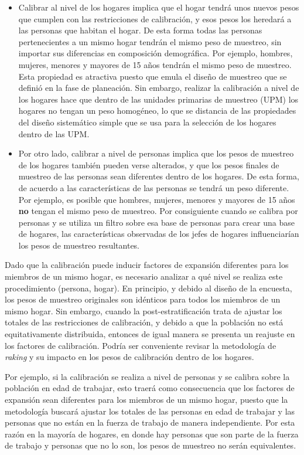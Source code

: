 \documentclass[
  12pt,
  spanish,
]{book}
\begin{document}
\begin{itemize}
\item
  Calibrar al nivel de los hogares implica que el hogar tendrá unos nuevos pesos que cumplen con las restricciones de calibración, y esos pesos los heredará a las personas que habitan el hogar. De esta forma todas las personas pertenecientes a un mismo hogar tendrán el mismo peso de muestreo, sin importar sus diferencias en composición demográfica. Por ejemplo, hombres, mujeres, menores y mayores de 15 años tendrán el mismo peso de muestreo. Esta propiedad es atractiva puesto que emula el diseño de muestreo que se definió en la fase de planeación. Sin embargo, realizar la calibración a nivel de los hogares hace que dentro de las unidades primarias de muestreo (UPM) los hogares no tengan un peso homogéneo, lo que se distancia de las propiedades del diseño sistemático simple que se usa para la selección de los hogares dentro de las UPM.
\item
  Por otro lado, calibrar a nivel de personas implica que los pesos de muestreo de los hogares también pueden verse alterados, y que los pesos finales de muestreo de las personas sean diferentes dentro de los hogares. De esta forma, de acuerdo a las características de las personas se tendrá un peso diferente. Por ejemplo, es posible que hombres, mujeres, menores y mayores de 15 años \textbf{no} tengan el mismo peso de muestreo. Por consiguiente cuando se calibra por personas y se utiliza un filtro sobre esa base de personas para crear una base de hogares, las características observadas de los jefes de hogares influenciarían los pesos de muestreo resultantes.
\end{itemize}

Dado que la calibración puede inducir factores de expansión diferentes para los miembros de un mismo hogar, es necesario analizar a qué nivel se realiza este procedimiento (persona, hogar). En principio, y debido al diseño de la encuesta, los pesos de muestreo originales son idénticos para todos los miembros de un mismo hogar. Sin embargo, cuando la post-estratificación trata de ajustar los totales de las restricciones de calibración, y debido a que la población no está equitativamente distribuida, entonces de igual manera se presenta un reajuste en los factores de calibración. Podría ser conveniente revisar la metodología de \emph{raking} y su impacto en los pesos de calibración dentro de los hogares.

Por ejemplo, si la calibración se realiza a nivel de personas y se calibra sobre la población en edad de trabajar, esto traerá como consecuencia que los factores de expansión sean diferentes para los miembros de un mismo hogar, puesto que la metodología buscará ajustar los totales de las personas en edad de trabajar y las personas que no están en la fuerza de trabajo de manera independiente. Por esta razón en la mayoría de hogares, en donde hay personas que son parte de la fuerza de trabajo y personas que no lo son, los pesos de muestreo no serán equivalentes.
\end{document}
